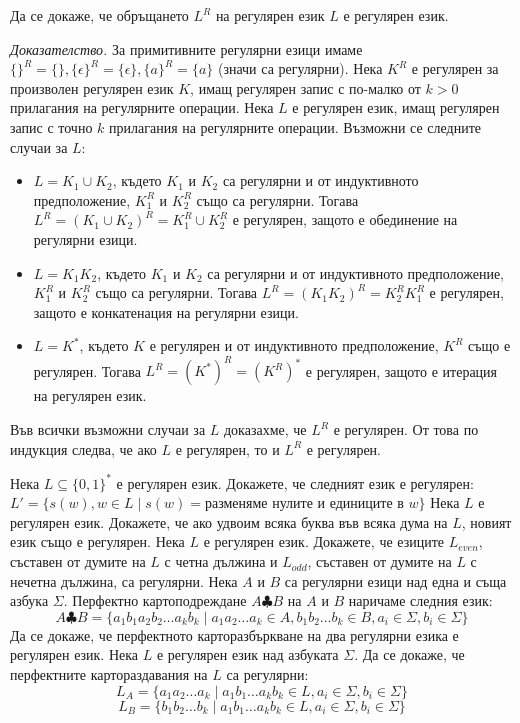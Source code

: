 \documentclass{exam}
\begin{document}
\begin{questions}

\question Да се докаже, че обръщането $L^R$ на регулярен език $L$ е регулярен език.

\emph{Доказателство.} За примитивните регулярни езици имаме $\{\}^R = \{\}, \{\epsilon\}^R = \{\epsilon\}, \{a\}^R = \{a\}$ (значи са регулярни). 
Нека $K^R$ е регулярен за произволен регулярен език $K$, имащ регулярен запис с по-малко от $k > 0$ прилагания на регулярните операции. Нека $L$ е регулярен език, 
имащ регулярен запис с точно $k$ прилагания на регулярните операции. Възможни се следните случаи за $L$:
\begin{itemize}
    \item $L = K_1 \cup K_2$, където $K_1$ и $K_2$ са регулярни и от индуктивното предположение, $K_1^R$ и $K_2^R$ също са регулярни. Тогава $L^R = (K_1 \cup K_2)^R = K_1^R \cup K_2^R$ е регулярен, защото е обединение на регулярни езици.
    \item $L = K_1 K_2$, където $K_1$ и $K_2$ са регулярни и от индуктивното предположение, $K_1^R$ и $K_2^R$ също са регулярни. Тогава $L^R = (K_1 K_2)^R = K_2^R K_1^R$ е регулярен, защото е конкатенация на регулярни езици.
    \item $L = K^*$, където $K$ е регулярен и от индуктивното предположение, $K^R$ също е регулярен. Тогава $L^R = (K^*)^R = (K^R)^*$ е регулярен, защото е итерация на регулярен език.
\end{itemize}
Във всички възможни случаи за $L$ доказахме, че $L^R$ е регулярен. От това по индукция следва, че ако $L$ е регулярен, то и $L^R$ е регулярен.

\question Нека $L \subseteq \{0, 1\}^*$ е регулярен език. Докажете, че следният език е регулярен:
$L' = \{s(w), w \in L \mid s(w) = \text{разменяме нулите и единиците в } w\}$
\question Нека $L$ е регулярен език. Докажете, че ако удвоим всяка буква във всяка дума на $L$, новият език също е регулярен.
\question Нека $L$ е регулярен език. Докажете, че езиците $L_{even}$, съставен от думите на $L$ с четна дължина и $L_{odd}$, съставен от думите на $L$ с нечетна дължина, са регулярни.
\question Нека $A$ и $B$ са регулярни езици над една и съща азбука $\Sigma$. Перфектно картоподреждане $A \clubsuit B$ на $A$ и $B$ наричаме следния език:
\[A \clubsuit B = \{ a_1 b_1 a_2 b_2 \dots a_k b_k \mid a_1 a_2 \dots a_k \in A, b_1 b_2 \dots b_k \in B, a_i \in \Sigma, b_i \in \Sigma\}\]
Да се докаже, че перфектното карторазбъркване на два регулярни езика е регулярен език.
\question Нека $L$ е регулярен език над азбуката $\Sigma$. Да се докаже, че перфектните картораздавания на $L$ са регулярни:
\[L_A = \{a_1 a_2 \dots a_k \mid a_1 b_1 \dots a_k b_k \in L, a_i \in \Sigma, b_i \in \Sigma\}\]
\[L_B = \{b_1 b_2 \dots b_k \mid a_1 b_1 \dots a_k b_k \in L, a_i \in \Sigma, b_i \in \Sigma\}\]


\end{questions}
\end{document}
